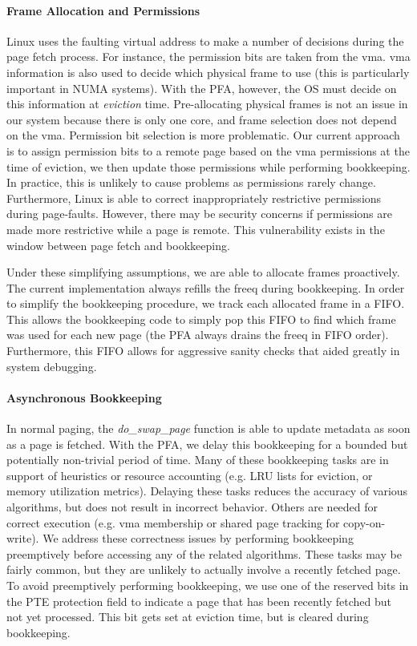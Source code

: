 \paragraph{Frame Allocation and Permissions}
Linux uses the faulting virtual address to make a number of decisions during
the page fetch process. For instance, the permission bits are taken from the
\gls{vma}. \gls{vma} information is also used to decide which physical frame to
use (this is particularly important in NUMA systems). With the PFA, however,
the OS must decide on this information at \emph{eviction} time. Pre-allocating
physical frames is not an issue in our system because there is only one core,
and frame selection does not depend on the \gls{vma}. Permission bit selection
is more problematic. Our current approach is to assign permission bits to a
remote page based on the \gls{vma} permissions at the time of eviction, we then
update those permissions while performing bookkeeping. In practice, this is
unlikely to cause problems as permissions rarely change. Furthermore, Linux is
able to correct inappropriately restrictive permissions during page-faults.
However, there may be security concerns if permissions are made more
restrictive while a page is remote. This vulnerability exists in the window
between page fetch and bookkeeping.

Under these simplifying assumptions, we are able to allocate frames
proactively. The current implementation always refills the \gls{freeq} during
bookkeeping. In order to simplify the bookkeeping procedure, we track
each allocated frame in a FIFO. This allows the bookkeeping code to simply pop
this FIFO to find which frame was used for each new page (the PFA always drains
the \gls{freeq} in FIFO order). Furthermore, this FIFO allows for aggressive
sanity checks that aided greatly in system debugging.

\paragraph{Asynchronous Bookkeeping}
In normal paging, the \emph{do\_swap\_page} function is able to update metadata as
soon as a page is fetched. With the PFA, we delay this bookkeeping for a
bounded but potentially non-trivial period of time. Many of these bookkeeping
tasks are in support of heuristics or resource accounting (e.g. LRU lists for
eviction, or memory utilization metrics). Delaying these tasks reduces the
accuracy of various algorithms, but does not result in incorrect behavior.
Others are needed for correct execution (e.g. \gls{vma} membership or shared
page tracking for copy-on-write). We address these correctness issues by
performing bookkeeping preemptively before accessing any of the related
algorithms. These tasks may be fairly common, but they are unlikely to actually
involve a recently fetched page. To avoid preemptively performing bookkeeping,
we use one of the reserved bits in the PTE protection field to indicate a page
that has been recently fetched but not yet processed. This bit gets set at
eviction time, but is cleared during bookkeeping.

